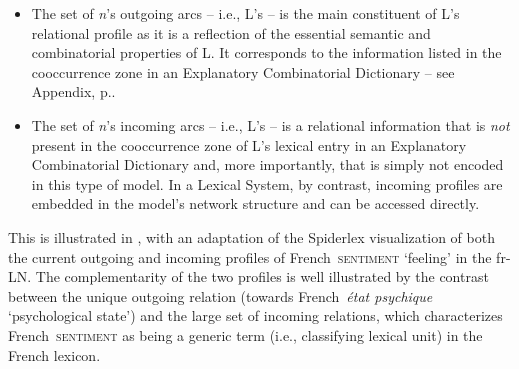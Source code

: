 \begin{itemize}

\item The set of \textit{n}'s outgoing arcs -- i.e., L's  -- is the main constituent of L's relational profile as it is a reflection of the essential semantic and combinatorial properties of L. It corresponds to the information listed in the cooccurrence zone in an Explanatory Combinatorial Dictionary -- see Appendix, p.\thinspace\pageref{sec:AppendixLFZone}.

\item The set of \textit{n}'s incoming arcs -- i.e., L's  -- is a relational information that is \emph{not} present in the cooccurrence zone of L's lexical entry in an Explanatory Combinatorial Dictionary and, more importantly, that is simply not encoded in this type of model. In a Lexical System, by contrast, incoming profiles are embedded in the model's network structure and can be accessed directly.

\end{itemize}

This is illustrated in	, with an adaptation of the Spiderlex visualization of both the current outgoing and incoming profiles of {\smaller French}~\textsc{sentiment} `feeling' in the fr-LN. The complementarity of the two profiles is well illustrated by the contrast between the unique outgoing  relation (towards {\smaller French}~\textit{état psychique} `psychological state') and the large set of incoming  relations, which characterizes {\smaller French}~\textsc{sentiment} as being a generic term (i.e., classifying lexical unit) in the French lexicon.


